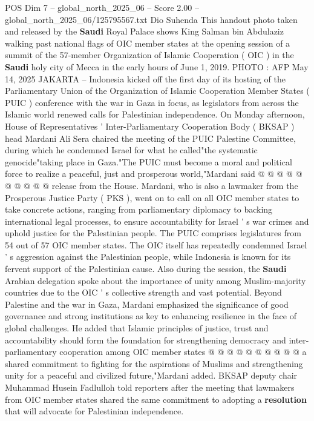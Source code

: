 \begin{textsample}{POS Dim 7 – global\_north\_2025\_06 – Score 2.00 – global\_north\_2025\_06/125795567.txt}  \label{ex:f7_pos_379}
Dio Suhenda This handout photo taken and released by the \textbf{Saudi} Royal Palace shows King Salman bin Abdulaziz walking past national flags of OIC member states at the opening session of a summit of the 57-member Organization of Islamic Cooperation ( OIC ) in the \textbf{Saudi} holy city of Mecca in the early hours of June 1, 2019.
PHOTO : AFP May 14, 2025 JAKARTA -- Indonesia kicked off the first day of its hosting of the Parliamentary Union of the Organization of Islamic Cooperation Member States ( PUIC ) conference with the war in Gaza in focus, as legislators from across the Islamic world renewed calls for Palestinian independence.
On Monday afternoon, House of Representatives ' Inter-Parliamentary Cooperation Body ( BKSAP ) head Mardani Ali Sera chaired the meeting of the PUIC Palestine Committee, during which he condemned Israel for what he called"the systematic genocide"taking place in Gaza."The PUIC must become a moral and political force to realize a peaceful, just and prosperous world,"Mardani said @ @ @ @ @ @ @ @ @ @ release from the House.
Mardani, who is also a lawmaker from the Prosperous Justice Party ( PKS ), went on to call on all OIC member states to take concrete actions, ranging from parliamentary diplomacy to backing international legal processes, to ensure accountability for Israel ' s war crimes and uphold justice for the Palestinian people.
The PUIC comprises legislatures from 54 out of 57 OIC member states.
The OIC itself has repeatedly condemned Israel ' s aggression against the Palestinian people, while Indonesia is known for its fervent support of the Palestinian cause.
Also during the session, the \textbf{Saudi} Arabian delegation spoke about the importance of unity among Muslim-majority countries due to the OIC ' s collective strength and vast potential.
Beyond Palestine and the war in Gaza, Mardani emphasized the significance of good governance and strong institutions as key to enhancing resilience in the face of global challenges.
He added that Islamic principles of justice, trust and accountability should form the foundation for strengthening democracy and inter-parliamentary cooperation among OIC member states @ @ @ @ @ @ @ @ @ @ a shared commitment to fighting for the aspirations of Muslims and strengthening unity for a peaceful and civilized future,"Mardani added.
BKSAP deputy chair Muhammad Husein Fadlulloh told reporters after the meeting that lawmakers from OIC member states shared the same commitment to adopting a \textbf{resolution} that will advocate for Palestinian independence.

\end{textsample}
